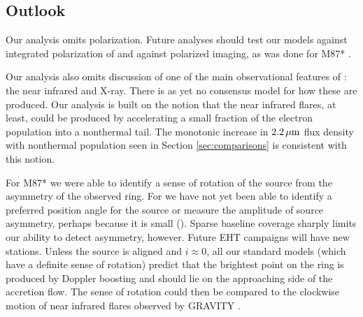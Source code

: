 


\subsection{Outlook}\label{sec:future}

Our analysis omits polarization. Future analyses should test our models against integrated polarization of \sgra \citep{2021ApJ...910L..14G} and against polarized imaging, as was done for M87* .

Our analysis also omits discussion of one of the main observational features of \sgra: the near infrared and X-ray.  There is as yet no consensus model for how these are produced. Our analysis is built on the notion that the near infrared flares, at least, could be produced by accelerating a small fraction of the electron population into a nonthermal tail.  The monotonic increase in $2.2\,\mu\mathrm{m}$ flux density with nonthermal population seen in Section \ref{sec:comparisons} is consistent with this notion.

For M87* we were able to identify a sense of rotation of the source from the asymmetry of the observed ring.  For \sgra we have not yet been able to identify a preferred position angle for the source or measure the amplitude of source asymmetry, perhaps because it is small ().  Sparse baseline coverage sharply limits our ability to detect asymmetry, however.  Future EHT campaigns will have new stations.  Unless the source is aligned and $i \approx 0$, all our standard models (which have a definite sense of rotation) predict that the brightest point on the ring is produced by Doppler boosting and should lie on the approaching side of the accretion flow.  The sense of rotation could then be compared to the clockwise motion of near infrared flares observed by GRAVITY \citep{2018A&A...618L..10G}.

